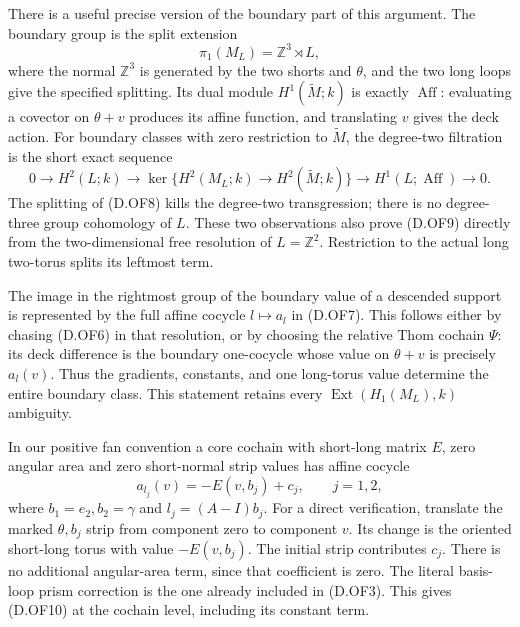 There is a useful precise version of the boundary part of this
argument. The boundary group is the split extension
\[
       \pi_1(M_L)=\mathbb Z^3\rtimes L,                    \tag{D.OF8}
\]
where the normal \(\mathbb Z^3\) is generated by the two shorts
and \(\theta\), and the two long loops give the specified splitting.
Its dual module \(H^1(\widetilde M;k)\) is exactly
\(\operatorname{Aff}\): evaluating a covector on
\(\theta+v\) produces its affine function, and translating \(v\)
gives the deck action.
For boundary classes with zero restriction to \(\widetilde M\),
the degree-two filtration is the short exact sequence
\[
 0\longrightarrow H^2(L;k)\longrightarrow
 \ker\{H^2(M_L;k)\to H^2(\widetilde M;k)\}
 \longrightarrow H^1(L;\operatorname{Aff})\longrightarrow0.
                                                               \tag{D.OF9}
\]
The splitting of (D.OF8) kills the degree-two transgression;
there is no degree-three group cohomology of \(L\).
These two observations also prove (D.OF9) directly from the
two-dimensional free resolution of \(L=\mathbb Z^2\).
Restriction to the actual long two-torus splits its leftmost term.

The image in the rightmost group of the boundary value of a
descended support is represented by the full affine cocycle
\(l\mapsto a_l\) in (D.OF7). This follows either by chasing
(D.OF6) in that resolution, or by choosing the relative Thom
cochain \(\Psi\): its deck difference is the boundary one-cocycle
whose value on \(\theta+v\) is precisely \(a_l(v)\).
Thus the gradients, constants, and one long-torus value determine
the entire boundary class. This statement retains every
\(\operatorname{Ext}(H_1(M_L),k)\) ambiguity.

In our positive fan convention a core cochain with short-long
matrix \(E\), zero angular area and zero short-normal strip values
has affine cocycle
\[
 a_{l_j}(v)=-E(v,b_j)+c_j,\qquad j=1,2,                  \tag{D.OF10}
\]
where \(b_1=e_2,b_2=\gamma\) and \(l_j=(A-I)b_j\).
For a direct verification, translate the marked \(\theta,b_j\)
strip from component zero to component \(v\). Its change is the
oriented short-long torus with value \(-E(v,b_j)\).
The initial strip contributes \(c_j\). There is no additional
angular-area term, since that coefficient is zero. The literal
basis-loop prism correction is the one already included in
(D.OF3). This gives (D.OF10) at the cochain level, including
its constant term.

